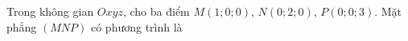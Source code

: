 \begin{ex}
Trong không gian $Oxyz$, cho ba điểm $M(1;0;0)$, $N(0;2;0)$, $P(0;0;3)$. Mặt phẳng $(MNP)$ có phương trình là
\end{ex}
